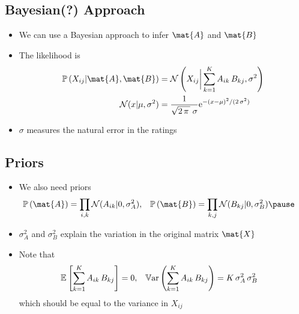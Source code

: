 \Outline %

\begin{slide}
\section{Bayesian(?) Approach}

\begin{PauseHighLight}
  \begin{itemize}
  \item We can use a Bayesian approach to infer $\mat{A}$ and $\mat{B}$\pause
  \item The likelihood is
    \begin{align*}
      \Prob{X_{ij}|\mat{A},\mat{B}} &=
      \mathcal{N}\left(X_{ij}\bigg|\sum_{k=1}^K
        A_{ik} \, B_{kj}, \sigma^2\right) \\
      \mathcal{N}(x|\mu,\sigma^2) &= \frac{1}{\sqrt{2\,\pi\,}\;\sigma}
      \e{-(x-\mu)^2/(2\,\sigma^2)}
    \end{align*}
  \item $\sigma$ measures the natural error in the ratings\pause
  \end{itemize}
\end{PauseHighLight}

\end{slide}


\begin{slide}
\section{Priors}

\begin{PauseHighLight}
  \begin{itemize}
  \item We also need priors
    \begin{align*}
      \Prob{\mat{A}} &= \prod_{i,k} \mathcal{N}(A_{ik}|0,\sigma_A^2), &
      \Prob{\mat{B}} &= \prod_{k,j} \mathcal{N}(B_{kj}|0,\sigma_B^2) \pause
    \end{align*}
  \item $\sigma_A^2$ and $\sigma_B^2$ explain the variation in the
    original matrix $\mat{X}$\pause
  \item Note that
    \begin{align*}
      \mathbb{E}_{}\left[ \sum_{k=1}^K A_{ik} \, B_{kj} \right] &= 0, &
      \mathbb{V}\mathrm{ar}\left( \sum_{k=1}^K A_{ik} \, B_{kj} \right) &= K\,\sigma_A^2\,\sigma_B^2
    \end{align*}
    which should be equal to the variance in $X_{ij}$\pause
  \end{itemize}
\end{PauseHighLight}

\end{slide}

